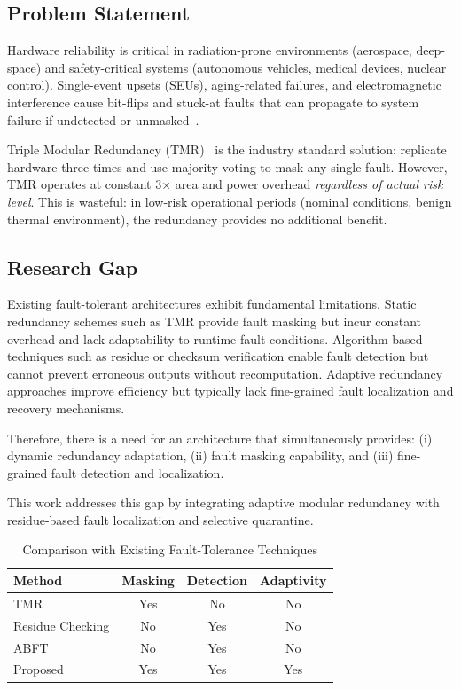 \documentclass[conference]{IEEEtran}
\begin{document}
\subsection{Problem Statement}

Hardware reliability is critical in radiation-prone environments (aerospace, deep-space) and safety-critical systems 
(autonomous vehicles, medical devices, nuclear control).
Single-event upsets (SEUs), aging-related failures, and electromagnetic interference cause bit-flips and stuck-at faults 
that can propagate to system failure if undetected or unmasked~\cite{nasa_fault,av_fault}.

Triple Modular Redundancy (TMR)~\cite{tmr_classic} is the industry standard solution: replicate hardware three times and use 
majority voting to mask any single fault. However, TMR operates at constant 3$\times$ area and power overhead \textit{regardless of actual risk level}.
This is wasteful: in low-risk operational periods (nominal conditions, benign thermal environment), the redundancy provides no additional benefit.

\subsection{Research Gap}

Existing fault-tolerant architectures exhibit fundamental limitations. 
Static redundancy schemes such as TMR provide fault masking but incur constant overhead and lack adaptability to runtime fault conditions. 
Algorithm-based techniques such as residue or checksum verification enable fault detection but cannot prevent erroneous outputs without recomputation. 
Adaptive redundancy approaches improve efficiency but typically lack fine-grained fault localization and recovery mechanisms.

Therefore, there is a need for an architecture that simultaneously provides:
(i) dynamic redundancy adaptation, 
(ii) fault masking capability, and 
(iii) fine-grained fault detection and localization.

This work addresses this gap by integrating adaptive modular redundancy with residue-based fault localization and selective quarantine.

\begin{table}[h]
\centering
\caption{Comparison with Existing Fault-Tolerance Techniques}
\begin{tabular}{lccc}
\toprule
Method & Masking & Detection & Adaptivity \\
\midrule
TMR & Yes & No & No \\
Residue Checking & No & Yes & No \\
ABFT & No & Yes & No \\
Proposed & Yes & Yes & Yes \\
\bottomrule
\end{tabular}
\end{table}
\end{document}
